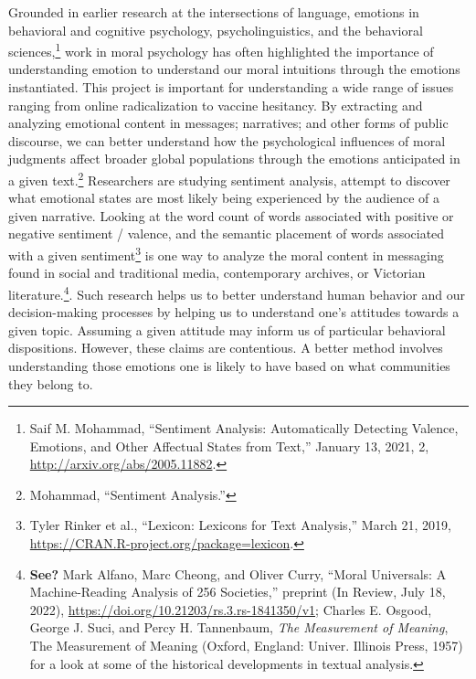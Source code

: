 \documentclass[
  12pt,
]{book}
\theoremstyle{definition}
\theoremstyle{definition}
\theoremstyle{definition}
\theoremstyle{definition}
\theoremstyle{remark}
\begin{document}
Grounded in earlier research at the intersections of language, emotions in behavioral and cognitive psychology, psycholinguistics, and the behavioral sciences,\footnote{Saif M. Mohammad, {``Sentiment {Analysis}: {Automatically Detecting Valence}, {Emotions}, and {Other Affectual States} from {Text},''} January 13, 2021, 2, \url{http://arxiv.org/abs/2005.11882}.} work in moral psychology has often highlighted the importance of understanding emotion to understand our moral intuitions through the emotions instantiated. This project is important for understanding a wide range of issues ranging from online radicalization to vaccine hesitancy. By extracting and analyzing emotional content in messages; narratives; and other forms of public discourse, we can better understand how the psychological influences of moral judgments affect broader global populations through the emotions anticipated in a given text.\footnote{Mohammad, {``Sentiment {Analysis}.''}} Researchers are studying sentiment analysis, attempt to discover what emotional states are most likely being experienced by the audience of a given narrative. Looking at the word count of words associated with positive or negative sentiment / valence, and the semantic placement of words associated with a given sentiment\footnote{Tyler Rinker et al., {``Lexicon: {Lexicons} for {Text Analysis},''} March 21, 2019, \url{https://CRAN.R-project.org/package=lexicon}.} is one way to analyze the moral content in messaging found in social and traditional media, contemporary archives, or Victorian literature.\footnote{\textbf{See?} Mark Alfano, Marc Cheong, and Oliver Curry, {``Moral {Universals}: {A} Machine-Reading Analysis of 256 Societies,''} preprint (In Review, July 18, 2022), \url{https://doi.org/10.21203/rs.3.rs-1841350/v1}; Charles E. Osgood, George J. Suci, and Percy H. Tannenbaum, \emph{The Measurement of Meaning}, The Measurement of Meaning (Oxford, England: Univer. Illinois Press, 1957) for a look at some of the historical developments in textual analysis.}. Such research helps us to better understand human behavior and our decision-making processes by helping us to understand one's attitudes towards a given topic. Assuming a given attitude may inform us of particular behavioral dispositions. However, these claims are contentious. A better method involves understanding those emotions one is likely to have based on what communities they belong to.
\end{document}
